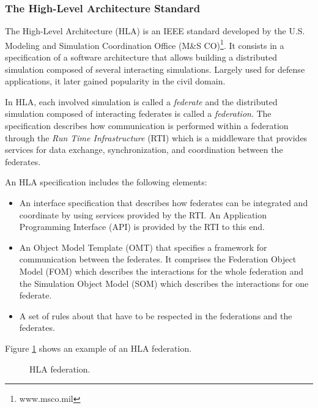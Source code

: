 \subsubsection{The High-Level Architecture Standard}

The High-Level Architecture (HLA) \cite{ieee1516:2012} is an IEEE standard developed by the U.S. Modeling and Simulation Coordination Office (M\&S CO)\footnote{www.msco.mil}. It consists in a specification of a software architecture that allows building a distributed simulation composed of several interacting simulations. Largely used for defense applications, it later gained popularity in the civil domain.

In HLA, each involved simulation is called a \textit{federate} and the distributed simulation composed of interacting federates is called a \textit{federation}. The specification describes how communication is performed within a federation through the \textit{Run Time Infrastructure} (RTI) which is a middleware that provides services for data exchange, synchronization, and coordination between the federates.

An HLA specification includes the following elements:

\begin{itemize}

\item An interface specification that describes how federates can be integrated and coordinate by using services provided by the RTI. An Application Programming Interface (API) is provided by the RTI to this end.

\item An Object Model Template (OMT) that specifies a framework for communication between the federates. It comprises the Federation Object Model (FOM) which describes the interactions for the whole federation and the Simulation Object Model (SOM) which describes the interactions for one federate.

\item A set of rules about that have to be respected in the federations and the federates.

\end{itemize}

Figure \ref{fig:hla} shows an example of an HLA federation.

\begin{figure}[phbt]
\centering

\caption{HLA federation.}
\label{fig:hla}
\end{figure} 

